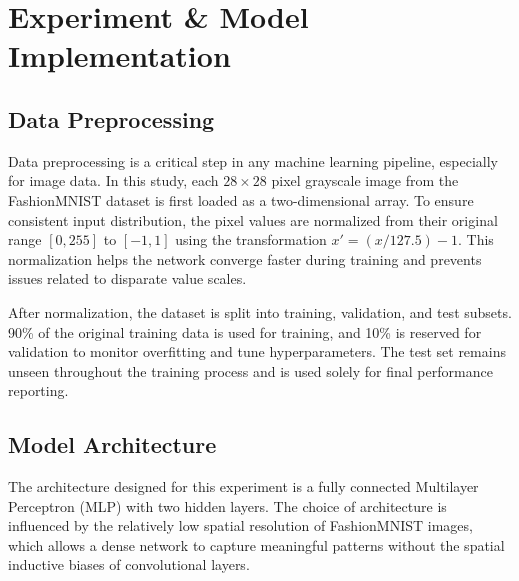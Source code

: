 \documentclass[a4paper, journal]{IEEEtran}
\begin{document}
\section{Experiment \& Model Implementation}

\subsection{Data Preprocessing}
Data preprocessing is a critical step in any machine learning pipeline, especially for image data. In this study, each $28 \times 28$ pixel grayscale image from the FashionMNIST dataset is first loaded as a two-dimensional array. To ensure consistent input distribution, the pixel values are normalized from their original range $[0, 255]$ to $[-1, 1]$ using the transformation $x' = (x / 127.5) - 1$. This normalization helps the network converge faster during training and prevents issues related to disparate value scales.

After normalization, the dataset is split into training, validation, and test subsets. 90\% of the original training data is used for training, and 10\% is reserved for validation to monitor overfitting and tune hyperparameters. The test set remains unseen throughout the training process and is used solely for final performance reporting.

\subsection{Model Architecture}
The architecture designed for this experiment is a fully connected Multilayer Perceptron (MLP) with two hidden layers. The choice of architecture is influenced by the relatively low spatial resolution of FashionMNIST images, which allows a dense network to capture meaningful patterns without the spatial inductive biases of convolutional layers.
\end{document}
